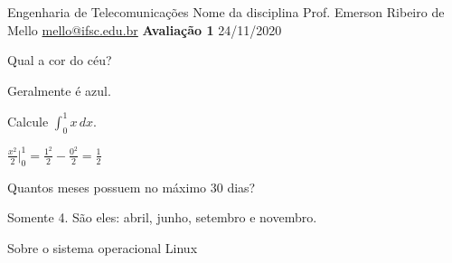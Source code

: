 \documentclass[11pt,addpoints]{ifscexam}
\begin{document}
\cabecalhoCurso%
{Engenharia de Telecomunicações}%
{Nome da disciplina}%
{Prof. Emerson Ribeiro de Mello}%
{\url{mello@ifsc.edu.br}}%
{\textbf{Avaliação 1}}%
{24/11/2020}%


\nomealuno{\rule{.58\linewidth}{.4pt}}



\begin{questions}

\question[1]
Qual a cor do céu?

\begin{solutionorlines}[2cm]
Geralmente é azul.
\end{solutionorlines}


\question[1]
Calcule $\displaystyle\int_0^1 x \, dx$.

\begin{solutionorbox}[2.5cm]
$\displaystyle\tfrac{x^2}{2}\Big|^1_0 = \tfrac{1^2}{2} - \tfrac{0^2}{2} = \tfrac{1}{2}$
\end{solutionorbox}

\question[1]
Quantos meses possuem no máximo 30 dias?
\begin{solutionorlines}[2cm]
Somente 4. São eles: abril, junho, setembro e novembro.
\end{solutionorlines}


\question[1]
Sobre o sistema operacional Linux
\end{questions}
\end{document}
